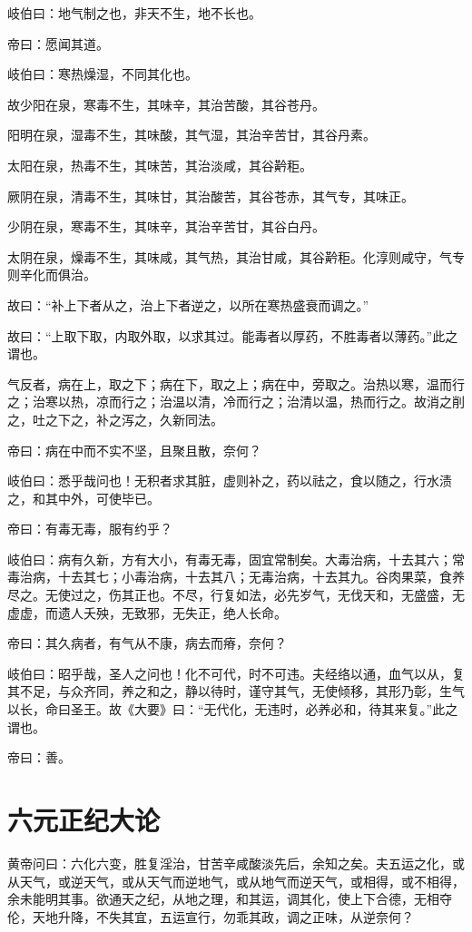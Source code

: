 \documentclass{article}%
\begin{document}
岐伯曰：地气制之也，非天不生，地不长也。

帝曰：愿闻其道。

岐伯曰：寒热燥湿，不同其化也。

故少阳在泉，寒毒不生，其味辛，其治苦酸，其谷苍丹。

阳明在泉，湿毒不生，其味酸，其气湿，其治辛苦甘，其谷丹素。

太阳在泉，热毒不生，其味苦，其治淡咸，其谷黅秬。

厥阴在泉，清毒不生，其味甘，其治酸苦，其谷苍赤，其气专，其味正。

少阴在泉，寒毒不生，其味辛，其治辛苦甘，其谷白丹。

太阴在泉，燥毒不生，其味咸，其气热，其治甘咸，其谷黅秬。化淳则咸守，气专则辛化而俱治。

故曰：“补上下者从之，治上下者逆之，以所在寒热盛衰而调之。”

故曰：“上取下取，内取外取，以求其过。能毒者以厚药，不胜毒者以薄药。”此之谓也。

气反者，病在上，取之下；病在下，取之上；病在中，旁取之。治热以寒，温而行之；治寒以热，凉而行之；治温以清，冷而行之；治清以温，热而行之。故消之削之，吐之下之，补之泻之，久新同法。

帝曰：病在中而不实不坚，且聚且散，奈何？

岐伯曰：悉乎哉问也！无积者求其脏，虚则补之，药以祛之，食以随之，行水渍之，和其中外，可使毕已。

帝曰：有毒无毒，服有约乎？

岐伯曰：病有久新，方有大小，有毒无毒，固宜常制矣。大毒治病，十去其六；常毒治病，十去其七；小毒治病，十去其八；无毒治病，十去其九。谷肉果菜，食养尽之。无使过之，伤其正也。不尽，行复如法，必先岁气，无伐天和，无盛盛，无虚虚，而遗人夭殃，无致邪，无失正，绝人长命。

帝曰：其久病者，有气从不康，病去而瘠，奈何？

岐伯曰：昭乎哉，圣人之问也！化不可代，时不可违。夫经络以通，血气以从，复其不足，与众齐同，养之和之，静以待时，谨守其气，无使倾移，其形乃彰，生气以长，命曰圣王。故《大要》曰：“无代化，无违时，必养必和，待其来复。”此之谓也。

帝曰：善。
\section{六元正纪大论}
黄帝问曰：六化六变，胜复淫治，甘苦辛咸酸淡先后，余知之矣。夫五运之化，或从天气，或逆天气，或从天气而逆地气，或从地气而逆天气，或相得，或不相得，余未能明其事。欲通天之纪，从地之理，和其运，调其化，使上下合德，无相夺伦，天地升降，不失其宜，五运宣行，勿乖其政，调之正味，从逆奈何？
\end{document}
